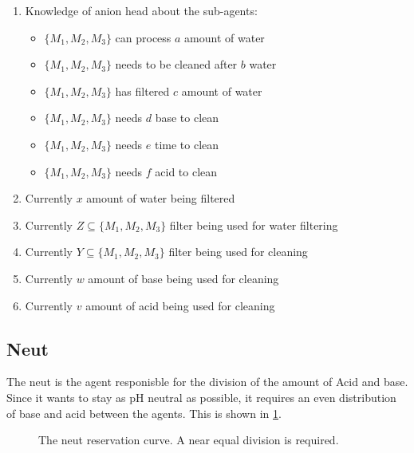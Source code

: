\begin{enumerate}
	\item
	Knowledge of anion head about the sub-agents:
	\begin{itemize}
		\item {$\{M_1, M_2, M_3\}$ can process $a$ amount of water}
		\item {$\{M_1, M_2, M_3\}$ needs to be cleaned after $b$ water}
		\item {$\{M_1, M_2, M_3\}$ has filtered $c$ amount of water}
		\item {$\{M_1, M_2, M_3\}$ needs $d$ base to clean}
		\item {$\{M_1, M_2, M_3\}$ needs $e$ time to clean}
		\item {$\{M_1, M_2, M_3\}$ needs $f$ acid to clean}
	\end{itemize}
	\item
	Currently $x$ amount of water being filtered 
	\item
	Currently $Z \subseteq \{M_1, M_2, M_3\}$ filter being used for water filtering
	\item
	Currently $Y \subseteq \{M_1, M_2, M_3\}$ filter being used for cleaning
	\item
	Currently $w$ amount of base being used for cleaning
	\item
	Currently $v$ amount of acid being used for cleaning
\end{enumerate}

\clearpage
\subsection{Neut}
The neut is the agent responisble for the division of the amount of Acid and base. Since it wants to stay as pH neutral as possible, it requires an even distribution of base and acid between the agents. This is shown in \cref{fig:neutreservationcurve}.
\begin{figure}
	\centering
		\caption{The neut reservation curve. A near equal division is required.}
		\label{fig:neutreservationcurve}
\end{figure}

